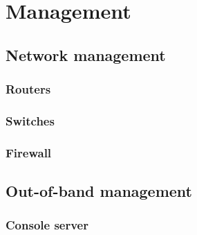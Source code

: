 \chapter{Management}

\section{Network management}

\subsection{Routers}

\subsection{Switches}

\subsection{Firewall}

\section{Out-of-band management}

\subsection{Console server}

